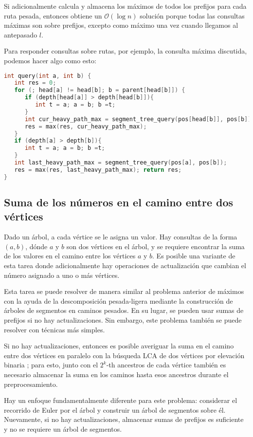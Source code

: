 Si adicionalmente calcula y almacena los máximos de todos los prefijos para cada ruta pesada, entonces obtiene un $\mathcal{O}(\log n)$ solución porque todas las consultas máximas son sobre prefijos, excepto como máximo una vez cuando llegamos al antepasado $l$.

Para responder consultas sobre rutas, por ejemplo, la consulta máxima discutida, podemos hacer algo como esto:
\begin{lstlisting}[language=C++]
int query(int a, int b) {
   int res = 0;
   for (; head[a] != head[b]; b = parent[head[b]]) {
      if (depth[head[a]] > depth[head[b]]){
         int t = a; a = b; b =t;
  	  }
      int cur_heavy_path_max = segment_tree_query(pos[head[b]], pos[b]);
      res = max(res, cur_heavy_path_max);
   }
   if (depth[a] > depth[b]){
      int t = a; a = b; b =t;
   }
   int last_heavy_path_max = segment_tree_query(pos[a], pos[b]);
   res = max(res, last_heavy_path_max); return res;
}
\end{lstlisting}
\subsection{Suma de los números en el camino entre dos vértices}

Dado un árbol, a cada vértice se le asigna un valor. Hay consultas de la forma $(a,b)$, dónde $a$ y $b$ 
son dos vértices en el árbol, y se requiere encontrar la suma de los valores en el camino entre los vértices $a$ y $b$. Es posible una variante de esta tarea donde adicionalmente hay operaciones de actualización que cambian el número asignado a uno o más vértices.

Esta tarea se puede resolver de manera similar al problema anterior de máximos con la ayuda de la descomposición pesada-ligera mediante la construcción de árboles de segmentos en caminos pesados. En su lugar, se pueden usar sumas de prefijos si no hay actualizaciones. Sin embargo, este problema también se puede resolver con técnicas más simples.

Si no hay actualizaciones, entonces es posible averiguar la suma en el camino entre dos vértices en paralelo con la búsqueda LCA de dos vértices por elevación binaria ; para esto, junto con el $2^k$-th ancestros de cada vértice también es necesario almacenar la suma en los caminos hasta esos ancestros durante el preprocesamiento.

Hay un enfoque fundamentalmente diferente para este problema: considerar el recorrido de Euler por el árbol y construir un árbol de segmentos sobre él. Nuevamente, si no hay actualizaciones, almacenar sumas de prefijos es suficiente y no se requiere un árbol de segmentos.

